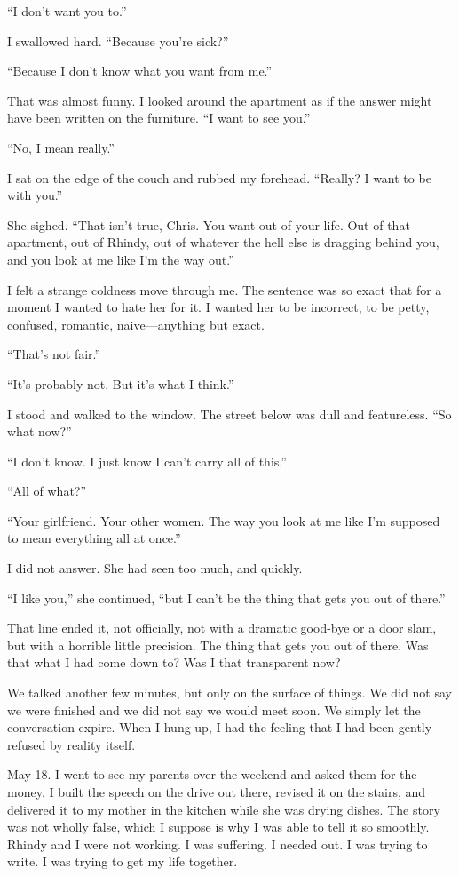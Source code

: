 ``I don't want you to.''

I swallowed hard. ``Because you're sick?''

``Because I don't know what you want from me.''

That was almost funny. I looked around the apartment as if the answer
might have been written on the furniture. ``I want to see you.''

``No, I mean really.''

I sat on the edge of the couch and rubbed my forehead. ``Really? I want
to be with you.''

She sighed. ``That isn't true, Chris. You want out of your life. Out of
that apartment, out of Rhindy, out of whatever the hell else is dragging
behind you, and you look at me like I'm the way out.''

I felt a strange coldness move through me. The sentence was so exact
that for a moment I wanted to hate her for it. I wanted her to be
incorrect, to be petty, confused, romantic, naive---anything but exact.

``That's not fair.''

``It's probably not. But it's what I think.''

I stood and walked to the window. The street below was dull and
featureless. ``So what now?''

``I don't know. I just know I can't carry all of this.''

``All of what?''

``Your girlfriend. Your other women. The way you look at me like I'm
supposed to mean everything all at once.''

I did not answer. She had seen too much, and quickly.

``I like you,'' she continued, ``but I can't be the thing that gets you
out of there.''

That line ended it, not officially, not with a dramatic good-bye or a
door slam, but with a horrible little precision. The thing that gets you
out of there. Was that what I had come down to? Was I that transparent
now?

We talked another few minutes, but only on the surface of things. We did
not say we were finished and we did not say we would meet soon. We
simply let the conversation expire. When I hung up, I had the feeling
that I had been gently refused by reality itself.

May 18. I went to see my parents over the weekend and asked them for the
money. I built the speech on the drive out there, revised it on the
stairs, and delivered it to my mother in the kitchen while she was
drying dishes. The story was not wholly false, which I suppose is why I
was able to tell it so smoothly. Rhindy and I were not working. I was
suffering. I needed out. I was trying to write. I was trying to get my
life together.

